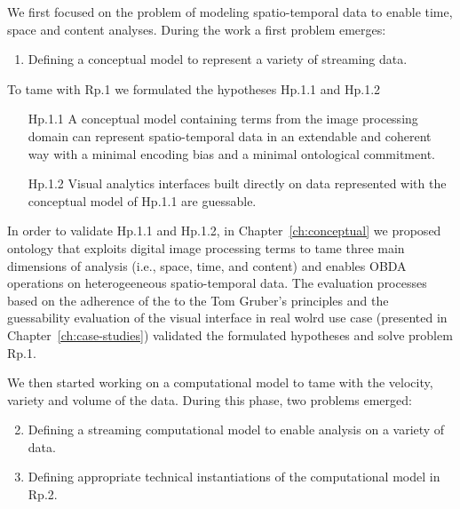 We first focused on the problem of modeling spatio-temporal data to enable time, space and content analyses. During the work a first problem emerges:

\begin{enumerate}[leftmargin=32pt,label=\textsf{Rp.\arabic*}]
\item Defining a conceptual model to represent a variety of streaming data.
\end{enumerate}

To tame with \textsf{Rp.1} we formulated the hypotheses \textsf{Hp.1.1} and \textsf{Hp.1.2}
\begin{itemize}[leftmargin=42pt]
\item[\textsf{Hp.1.1}] A conceptual model containing terms from the image processing domain can represent spatio-temporal data in an extendable and coherent way with a minimal encoding bias and a minimal ontological commitment.
\item[\textsf{Hp.1.2}] Visual analytics interfaces built directly on data represented with the conceptual model of Hp.1.1 are guessable.
\end{itemize}

In order to validate \textsf{Hp.1.1} and \textsf{Hp.1.2}, in Chapter~\ref{ch:conceptual} we proposed \frappe{} ontology that exploits digital image processing terms to tame three main dimensions of analysis (i.e., space, time, and content) and enables OBDA operations on heterogeeneous spatio-temporal data.
The evaluation processes based on the adherence of the \frappe{} to the Tom Gruber's principles and the guessability evaluation of the visual interface in real wolrd use case (presented in Chapter~\ref{ch:case-studies}) validated the formulated hypotheses and solve problem \textsf{Rp.1}.

We then started working on a computational model to tame with the velocity, variety and volume of the data. During this phase, two problems emerged:
\begin{enumerate}[leftmargin=32pt,label=\textsf{Rp.\arabic*}]
\setcounter{enumi}{1}
\item Defining a streaming computational model to enable analysis on a variety of data.
\item Defining appropriate technical instantiations of the computational model in \textsf{Rp.2}.
\end{enumerate}


